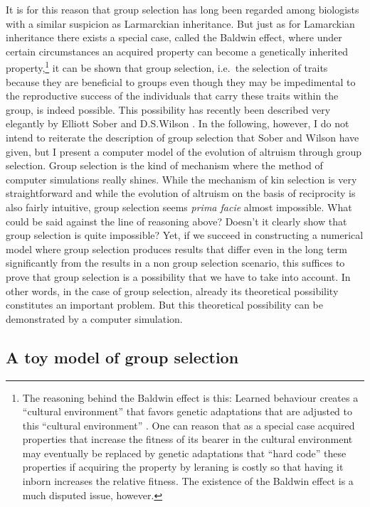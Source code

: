 It \label{againstGS} is for this reason that group selection has long been
regarded among biologists with a similar suspicion as Larmarckian inheritance.
But just as for Lamarckian inheritance there exists a special case, called the
Baldwin effect, where under certain circumstances an acquired property can
become a genetically inherited property,\footnote{The reasoning behind the
  Baldwin effect is this: Learned behaviour creates a ``cultural environment''
that favors genetic adaptations that are adjusted to this ``cultural
environment'' \cite[p.\ 6ff.]{depew:2003}. One can reason that as a special case
acquired properties that increase the fitness of its bearer in the cultural
environment may eventually be replaced by genetic adaptations that ``hard
code'' these properties if acquiring the property by leraning is costly so
that having it inborn increases the relative fitness. The existence of the
Baldwin effect is a much disputed issue, however.} it can be shown that group
selection, i.e.\ the selection of traits because
they are beneficial to groups even though they may be impedimental to the
reproductive success of the individuals that carry these traits within the
group, is indeed possible. This possibility has recently been described very
elegantly by Elliott Sober and D.S.Wilson \cite[]{sober-wilson:1998}. In the
following, however, I do not intend to reiterate the description of group
selection that Sober and Wilson have given, but I present a computer model of
the evolution of altruism through group selection. Group selection is the kind
of mechanism where the method of computer simulations really shines. While the
mechanism of kin selection is very straightforward and while the evolution of
altruism on the basis of reciprocity is also fairly intuitive, group selection
seems {\em prima facie} almost impossible. What could be said against the line
of reasoning above? Doesn't it clearly show that group selection is quite
impossible?  Yet, if we succeed in constructing a numerical model where group
selection produces results that differ even in the long term significantly
from the results in a non group selection scenario, this suffices to prove
that group selection is a possibility that we have to take into account. In
other words, in the case of group selection, already its theoretical
possibility constitutes an important problem. But this theoretical possibility
can be demonstrated by a computer simulation.

\subsection{A toy model of group selection}
\label{groupSelectionModel}

